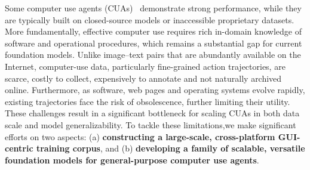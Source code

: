 \documentclass{article} %
\begin{document}

Some computer use agents (CUAs)~\citep{qin2025uitars,anthropic2025claude37,hong2025glm,cua2025} demonstrate strong performance, while they are typically built on closed-source models or inaccessible proprietary datasets.
% 
More fundamentally, effective computer use requires rich in-domain knowledge of software and operational procedures, which remains a substantial gap for current foundation models. Unlike image–text pairs that are abundantly available on the Internet, computer-use data, particularly fine-grained action trajectories, are scarce, costly to collect, expensively to annotate and not naturally archived online.
% 
Furthermore, as software, web pages and operating systems evolve rapidly, existing trajectories face the risk of obsolescence, further limiting their utility. 
% 
These challenges result in a significant bottleneck for scaling CUAs in both data scale and model generalizability. 
% 
To tackle these limitations,we make significant efforts on two aspects: (a) \textbf{constructing a large-scale, cross-platform GUI-centric training corpus}, and (b) \textbf{developing a family of scalable, versatile foundation models for general-purpose computer use agents}.
\end{document}
